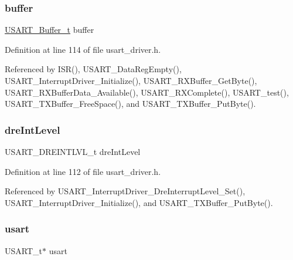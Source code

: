 \subsubsection{\texorpdfstring{buffer}{buffer}}
{\footnotesize\ttfamily \hyperlink{usart__driver_8h_af27d135e807dcd1846b6f175997c5f45}{U\+S\+A\+R\+T\+\_\+\+Buffer\+\_\+t} buffer}



Definition at line 114 of file usart\+\_\+driver.\+h.



Referenced by I\+S\+R(), U\+S\+A\+R\+T\+\_\+\+Data\+Reg\+Empty(), U\+S\+A\+R\+T\+\_\+\+Interrupt\+Driver\+\_\+\+Initialize(), U\+S\+A\+R\+T\+\_\+\+R\+X\+Buffer\+\_\+\+Get\+Byte(), U\+S\+A\+R\+T\+\_\+\+R\+X\+Buffer\+Data\+\_\+\+Available(), U\+S\+A\+R\+T\+\_\+\+R\+X\+Complete(), U\+S\+A\+R\+T\+\_\+test(), U\+S\+A\+R\+T\+\_\+\+T\+X\+Buffer\+\_\+\+Free\+Space(), and U\+S\+A\+R\+T\+\_\+\+T\+X\+Buffer\+\_\+\+Put\+Byte().

\hypertarget{struct_usart__and__buffer_ad854f355ca0804e81a03cd57c659da59}{}\label{struct_usart__and__buffer_ad854f355ca0804e81a03cd57c659da59} 
\subsubsection{\texorpdfstring{dre\+Int\+Level}{dreIntLevel}}
{\footnotesize\ttfamily U\+S\+A\+R\+T\+\_\+\+D\+R\+E\+I\+N\+T\+L\+V\+L\+\_\+t dre\+Int\+Level}



Definition at line 112 of file usart\+\_\+driver.\+h.



Referenced by U\+S\+A\+R\+T\+\_\+\+Interrupt\+Driver\+\_\+\+Dre\+Interrupt\+Level\+\_\+\+Set(), U\+S\+A\+R\+T\+\_\+\+Interrupt\+Driver\+\_\+\+Initialize(), and U\+S\+A\+R\+T\+\_\+\+T\+X\+Buffer\+\_\+\+Put\+Byte().

\hypertarget{struct_usart__and__buffer_a5a819ee5e46999aaae5cb6813014ec08}{}\label{struct_usart__and__buffer_a5a819ee5e46999aaae5cb6813014ec08} 
\subsubsection{\texorpdfstring{usart}{usart}}
{\footnotesize\ttfamily U\+S\+A\+R\+T\+\_\+t$\ast$ usart}



